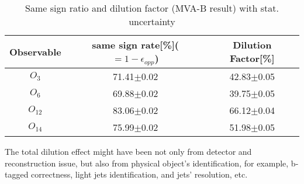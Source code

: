 		\begin{center}
		\setlength{\tabcolsep}{12pt}
		\begin{longtable}{ c | c c }
		\caption{Same sign ratio and dilution factor (MVA-B result) with stat. uncertainty} \\
		Observable & same sign rate[\%]($=1-\epsilon_{opp}$) & Dilution Factor[\%] \\
		\hline
		$O_{3}$ & 71.41$\pm$0.02  &  42.83$\pm$0.05  \\
		$O_{6}$ &  69.88$\pm$0.02  &  39.75$\pm$0.05  \\
		$O_{12}$ &  83.06$\pm$0.02  &  66.12$\pm$0.04  \\
		$O_{14}$ &  75.99$\pm$0.02  &  51.98$\pm$0.05  \\
		\hline
		\end{longtable}
		\label{Dilution:tb:MVAB}
		\end{center}

		The total dilution effect might have been not only from detector and reconstruction issue, but also from physical object's identification, for example, b-tagged correctness, light jets identification, and jets' resolution, etc. 

\FloatBarrier
